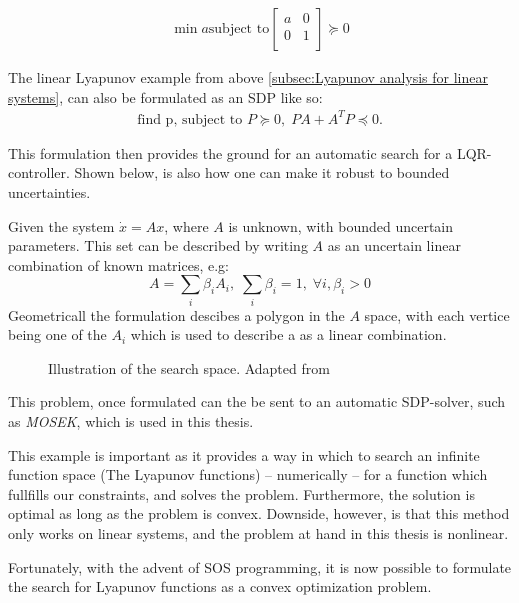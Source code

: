 \begin{align*}
  \min{a} \text{subject to}
  \begin{bmatrix}
    a & 0 \\
    0 & 1 \\
  \end{bmatrix}
  \succeq 0
\end{align*}\cite{tedrakeUnderactuatedRoboticsAlgorithms2019}

The linear Lyapunov example from above \ref{subsec:Lyapunov analysis for linear
  systems}, can also be formulated as an \ac{SDP} like so:
\begin{align*}
  \text{find p, subject to } P \succeq 0, \; PA + A^{T}P \preceq 0.
\end{align*}\cite{tedrakeUnderactuatedRoboticsAlgorithms2019}

This formulation then provides the ground for an automatic search for a
\ac{LQR}-controller. Shown below, is also how one can make it robust to bounded
uncertainties.

Given the system \(\dot{x} = Ax\), where \(A\) is unknown, with bounded
uncertain parameters. This set can be described by writing \(A\) as an uncertain
linear combination of known matrices, e.g:
\[
  A = \sum_{i} \beta_{i}A_{i}, \; \sum_{i}\beta_{i} = 1, \; \forall i,\beta_{i}
  > 0
\]
Geometricall the formulation descibes a polygon in the \(A\) space, with each
vertice being one of the \(A_{i}\) which is used to describe a as a linear
combination.

\begin{figure}
  
  \caption{Illustration of the search space. Adapted from~\cite{tedrakeUnderactuatedRoboticsAlgorithms2019}}
\end{figure}


This problem, once formulated can the be sent to an automatic \ac{SDP}-solver,
such as \textit{MOSEK}\cite{mosek}, which is used in this thesis.

This example is important as it provides a way in which to search an infinite
function space (The Lyapunov functions) -- numerically -- for a function which
fullfills our constraints, and solves the problem. Furthermore, the solution is
optimal as long as the problem is convex. Downside, however, is that this method
only works on linear systems, and the problem at hand in this thesis is
nonlinear.

Fortunately, with the advent of \ac{SOS} programming, it is now possible to
formulate the search for Lyapunov functions as a convex optimization problem.


